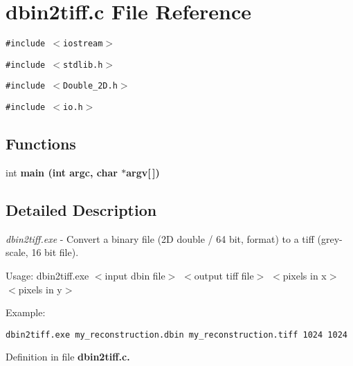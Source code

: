 \section{dbin2tiff.c File Reference}
\label{dbin2tiff_8c}
{\tt \#include $<$iostream$>$}\par
{\tt \#include $<$stdlib.h$>$}\par
{\tt \#include $<$Double\_\-2D.h$>$}\par
{\tt \#include $<$io.h$>$}\par
\subsection*{Functions}
\begin{CompactItemize}
\item 
int \bf{main} (int argc, char $\ast$argv[$\,$])\label{dbin2tiff_8c_28052c36c3b61c6c0eaa18f5d226118f}

\end{CompactItemize}


\subsection{Detailed Description}
{\em dbin2tiff.exe\/} - Convert a binary file (2D double / 64 bit, format) to a tiff (grey-scale, 16 bit file).

\begin{Desc}
\item[Usage: dbin2tiff.exe $<$input dbin file$>$ $<$output tiff file$>$]$<$pixels in x$>$ $<$pixels in y$>$\end{Desc}
\begin{Desc}
\item[]\end{Desc}
\begin{Desc}
\item[Example:]

\footnotesize\begin{verbatim}dbin2tiff.exe my_reconstruction.dbin my_reconstruction.tiff 1024 1024 \end{verbatim}
\normalsize
 \end{Desc}


Definition in file \bf{dbin2tiff.c}.